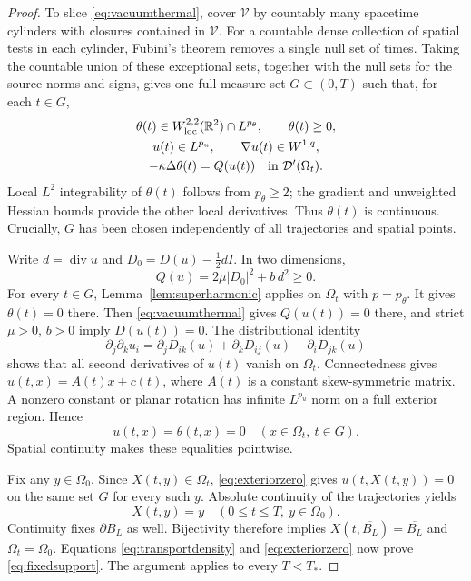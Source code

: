 \documentclass[10pt,twoside]{article}
\newcommand{\R}{\mathbb R}
\newcommand{\Div}{\operatorname{div}}
\begin{document}
\begin{proof}
To slice \eqref{eq:vacuumthermal}, cover $\mathcal V$ by countably
many spacetime cylinders with closures contained in $\mathcal V$.
For a countable dense collection of spatial tests in each cylinder,
Fubini's theorem removes a single null set of times. Taking the
countable union of these exceptional sets, together with the null
sets for the source norms and signs, gives one full-measure set
$G\subset(0,T)$ such that, for each $t\in G$,
\begin{equation}
 \begin{gathered}
 \theta(t)\in W^{2,2}_{\mathrm{loc}}(\R^2)\cap L^{p_\theta},
       \qquad \theta(t)\ge0,\\
 u(t)\in L^{p_u},\qquad \nabla u(t)\in W^{1,q},\\
 -\kappa\Delta\theta(t)=Q(u(t))
       \quad\hbox{in }\mathcal D'(\Omega_t).
 \end{gathered}\label{eq:commontimes}
\end{equation}
Local $L^2$ integrability of $\theta(t)$ follows from $p_\theta\ge2$;
the gradient and unweighted Hessian bounds provide the other local
derivatives. Thus $\theta(t)$ is continuous. Crucially, $G$ has been
chosen independently of all trajectories and spatial points.

Write $d=\Div u$ and $D_0=D(u)-\tfrac12dI$. In two dimensions,
\begin{equation}
 Q(u)=2\mu|D_0|^2+b\,d^2\ge0.
 \label{eq:positiveQ}
\end{equation}
For every $t\in G$, Lemma~\ref{lem:superharmonic} applies on
$\Omega_t$ with $p=p_\theta$. It gives $\theta(t)=0$ there.
Then \eqref{eq:vacuumthermal} gives $Q(u(t))=0$ there, and strict
$\mu>0$, $b>0$ imply $D(u(t))=0$. The distributional identity
\begin{equation}
 \partial_j\partial_k u_i
   =\partial_j D_{ik}(u)+\partial_k D_{ij}(u)
                         -\partial_i D_{jk}(u)
 \label{eq:rigididentity}
\end{equation}
shows that all second derivatives of $u(t)$ vanish on $\Omega_t$.
Connectedness gives $u(t,x)=A(t)x+c(t)$, where $A(t)$ is a constant
skew-symmetric matrix. A nonzero constant or planar rotation has
infinite $L^{p_u}$ norm on a full exterior region. Hence
\begin{equation}
 u(t,x)=\theta(t,x)=0
       \quad(x\in\Omega_t,\ t\in G).
 \label{eq:exteriorzero}
\end{equation}
Spatial continuity makes these equalities pointwise.

Fix any $y\in\Omega_0$. Since $X(t,y)\in\Omega_t$,
\eqref{eq:exteriorzero} gives $u(t,X(t,y))=0$ on the same set $G$
for every such $y$. Absolute continuity of the trajectories yields
\[
 X(t,y)=y\quad(0\le t\le T,\ y\in\Omega_0).
\]
Continuity fixes $\partial B_L$ as well. Bijectivity therefore implies
$X(t,\overline{B_L})=\overline{B_L}$ and $\Omega_t=\Omega_0$.
Equations \eqref{eq:transportdensity} and \eqref{eq:exteriorzero}
now prove \eqref{eq:fixedsupport}. The argument applies to every
$T<T_*$.
\end{proof}
\end{document}
